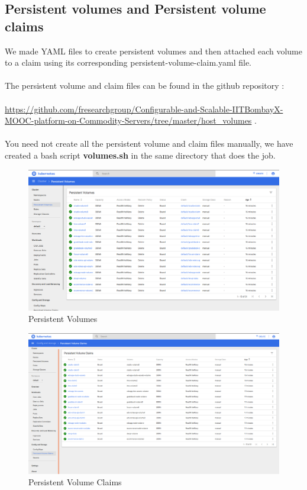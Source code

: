 \documentclass[12pt]{report}
\begin{document}
\subsection{Persistent volumes and Persistent volume claims}
We made YAML files to create persistent volumes and then attached each volume to a claim using its corresponding persistent-volume-claim.yaml file.\\\\
The persistent volume and claim files can be found in the github repository :\\\\ \href{https://github.com/fresearchgroup/Configurable-and-Scalable-IITBombayX-MOOC-platform-on-Commodity-Servers/tree/master/host_volumes}{https://github.com/fresearchgroup/Configurable-and-Scalable-IITBombayX-MOOC-platform-on-Commodity-Servers/tree/master/host\_volumes} \cite{Hostvolumes}. \\\\You need not create all the persistent volume and claim files manually, we have created a bash script \textbf{volumes.sh} in the same directory that does the job. 
\begin{figure}[h!]
	\begin{center}
		\includegraphics[totalheight=0.39\textheight]{PersistentVolume}
		\caption{Persistent Volumes}
	\end{center}
\end{figure}
\begin{figure}[h!]
	\begin{center}
		\includegraphics[totalheight=0.39\textheight]{PersistentVolumeClaim}
		\caption{Persistent Volume Claims}
	\end{center}
\end{figure}
\end{document}
